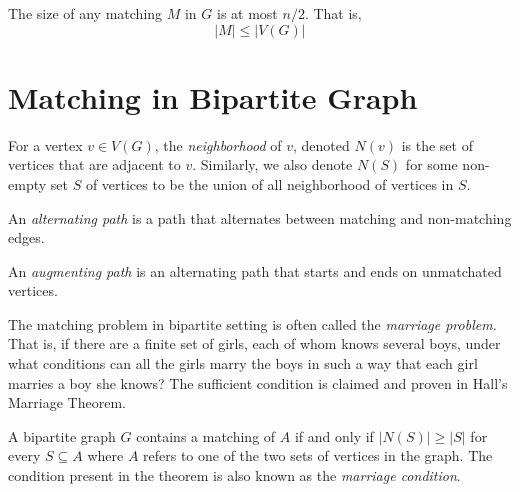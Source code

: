 \begin{remark}
  The size of any matching \(M\) in \(G\) is at most \(n/2\). That is,
  \[ |M| \leq |V(G)| \]
\end{remark}

\section{Matching in Bipartite Graph}

\begin{definition}[Neighborhood]
  For a vertex \(v \in V(G)\), the \textit{neighborhood} of \(v\), denoted
  \(N(v)\) is the set of vertices that are adjacent to \(v\).
  Similarly, we also denote \(N(S)\) for some non-empty set \(S\) of
  vertices to be the union of all neighborhood of vertices in \(S\).
\end{definition}

\begin{definition}
  An \textit{alternating path} is a path that alternates between matching and
  non-matching edges.
\end{definition}

\begin{definition}
  An \textit{augmenting path} is an alternating path that starts and ends on
  unmatchated vertices.
\end{definition}

The matching problem in bipartite setting is often called the \textit{marriage
problem}. That is, if there are a finite set of girls, each of whom knows
several boys, under what conditions can all the girls marry the boys in such a
way that each girl marries a boy she knows? The sufficient condition is claimed
and proven in Hall's Marriage Theorem.

\begin{theorem}
  A bipartite graph \(G\) contains a matching of \(A\) if and only if \(|N(S)|
  \geq |S|\) for every \(S \subseteq A\) where \(A\) refers to one of the two
  sets of vertices in the graph. The condition present in the theorem is also 
  known as the \textit{marriage condition}.
\end{theorem}

